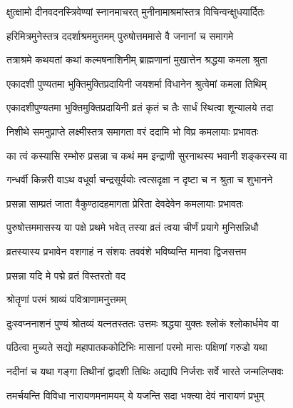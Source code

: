 \twolineshloka
{क्षुत्क्षामो दीनवदनस्त्रिवेण्यां स्नानमाचरत्}
{मुनीनामाश्रमांस्तत्र विचिन्वन्क्षुधयार्दितः}%

\twolineshloka
{हरिमित्रमुनेस्तत्र ददर्शाश्रममुत्तमम्}
{पुरुषोत्तममासे वै जनानां च समागमे}%

\twolineshloka
{तत्राश्रमे कथयतां कथां कल्मषनाशिनीम्}
{ब्राह्मणानां मुखात्तेन श्रद्धया कमला श्रुता}%

\twolineshloka
{एकादशी पुण्यतमा भुक्तिमुक्तिप्रदायिनी}
{जयशर्मा विधानेन श्रुत्वेमां कमला तिथिम्}%

\twolineshloka
{एकादशीपुण्यतमा भुक्तिमुक्तिप्रदायिनी}
{व्रतं कृतं च तैः सार्धं स्थित्वा शून्यालये तदा}%

\twolineshloka
{निशीथे समनुप्राप्ते लक्ष्मीस्तत्र समागता}
{वरं ददामि भो विप्र कमलायाः प्रभावतः}%


\twolineshloka
{का त्वं कस्यासि रम्भोरु प्रसन्ना च कथं मम}
{इन्द्राणी सुरनाथस्य भवानी शङ्करस्य वा}%

\twolineshloka
{गन्धर्वी किन्नरी वाऽथ वधूर्वा चन्द्रसूर्ययोः}
{त्वत्सदृक्षा न दृष्टा च न श्रुता च शुभानने}%


\twolineshloka
{प्रसन्ना साम्प्रतं जाता वैकुण्ठादहमागता}
{प्रेरिता देवदेवेन कमलायाः प्रभावतः}%

\twolineshloka
{पुरुषोत्तममासस्य या पक्षे प्रथमे भवेत्}
{तस्या व्रतं त्वया चीर्णं प्रयागे मुनिसन्निधौ}%

\twolineshloka
{व्रतस्यास्य प्रभावेन वशगाहं न संशयः}
{तववंशे भविष्यन्ति मानवा द्विजसत्तम}%

\onelineshloka
{प्रसन्ना यदि मे पद्मे व्रतं विस्तरतो वद}%

\onelineshloka
{श्रोतॄणां परमं श्राव्यं पवित्राणामनुत्तमम्}%

\twolineshloka
{दुःस्वप्ननाशनं पुण्यं श्रोतव्यं यत्नतस्ततः}
{उत्तमः श्रद्धया युक्तः श्लोकं श्लोकार्धमेव वा}%

\twolineshloka
{पठित्वा मुच्यते सद्यो महापातककोटिभिः}
{मासानां परमो मासः पक्षिणां गरुडो यथा}%

\twolineshloka
{नदीनां च यथा गङ्गा तिथीनां द्वादशी तिथिः}
{अद्यापि निर्जराः सर्वे भारते जन्मलिप्सवः}%

\twolineshloka
{तमर्चयन्ति विविधा नारायणमनामयम्}
{ये यजन्ति सदा भक्त्या देवं नारायणं प्रभुम्}%

